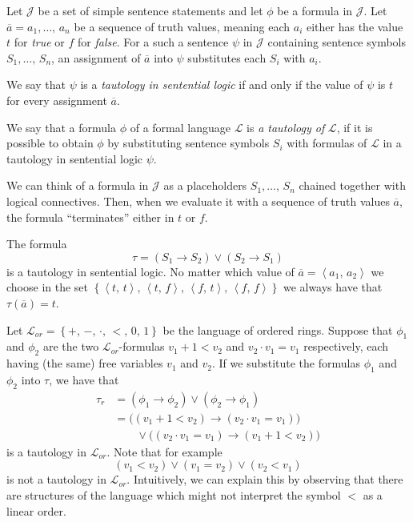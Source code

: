 \documentclass[../../main.tex]{subfiles}
\begin{document}
\begin{definition}[Tautology]\cite[pp.8, 24]{Cha90}
    Let $\mathcal{J}$ be a set of simple sentence statements and let $\phi$ be a formula in $\mathcal{J}$.
    Let $\overline{a} = a_1,\ldots,\, a_n$ be a sequence of truth values, meaning each $a_i$ either has the value $t$ for \textit{true} or $f$ for \textit{false}.
    For a such a sentence $\psi$ in $\mathcal{J}$ containing sentence symbols $S_1,\ldots,\, S_n$, 
    an assignment of $\overline{a}$ into $\psi$ substitutes each $S_i$ with $a_i$.

    We say that $\psi$ is a \textit{tautology in sentential logic} if and only if the value of $\psi$ is $t$ for every assignment $\overline{a}$.

    We say that a formula $\phi$ of a formal language $\mathcal{L}$ is \textit{a tautology of} $\mathcal{L}$, 
    if it is possible to obtain $\phi$ by substituting sentence symbols $S_i$ with formulas of $\mathcal{L}$ in a tautology in sentential logic $\psi$. 
\end{definition}

We can think of a formula in $\mathcal{J}$ as a placeholders $S_1,\ldots,\, S_n$ chained together with logical connectives.
Then, when we evaluate it with a sequence of truth values $\overline{a}$, the formula ``terminates'' either in $t$ or $f$.

\begin{example}
    The formula $$\tau = \left(S_1 \rightarrow S_2\right) \vee \left(S_2 \rightarrow S_1\right)$$
    is a tautology in sentential logic.
    No matter which value of $\overline{a} = \left<a_1,\, a_2\right>$ we choose in the set 
    $\left\{\left<t,\, t\right>,\, \left<t,\, f\right>,\, \left<f,\, t\right>,\, \left<f,\, f\right>\right\}$ 
    we always have that $\tau(\overline{a}) = t$.

    Let $\mathcal{L}_{or} = \left\{+,\, -,\, \cdot,\, <,\, 0,\, 1\right\}$ be the language of ordered rings.
    Suppose that $\phi_1$ and $\phi_2$ are the two $\mathcal{L}_{or}$-formulas $v_1 + 1 < v_2$ and $v_2 \cdot v_1 = v_1$ respectively,
    each having (the same) free variables $v_1$ and $v_2$.
    If we substitute the formulas $\phi_1$ and $\phi_2$ into $\tau$, we have that
    \begin{align*}
        \tau_r
        &= \left(\phi_1 \rightarrow \phi_2\right) \vee \left(\phi_2 \rightarrow \phi_1\right) \\
        &= \big(\left(v_1 + 1 < v_2\right) \rightarrow \left(v_2 \cdot v_1 = v_1\right)\big) \\
        &  \qquad \vee \big(\left(v_2 \cdot v_1 = v_1\right) \rightarrow \left(v_1 + 1 < v_2\right)\big)
    \end{align*}
    is a tautology in $\mathcal{L}_{or}$.
    Note that for example $$(v_1 < v_2) \vee (v_1 = v_2) \vee (v_2 < v_1)$$ is not a tautology in $\mathcal{L}_{or}$.
    Intuitively, we can explain this by observing that there are structures of the language which might not interpret the symbol $<$ as a linear order.
\end{example}
\end{document}
